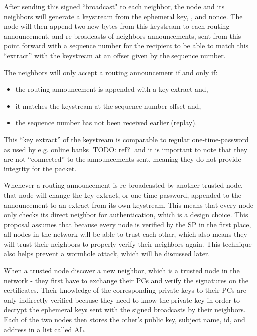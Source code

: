 After sending this signed ``broadcast" to each neighbor, the node and its
neighbors will generate a keystream from the ephemeral key, , and nonce. The
node will then append two new bytes from this keystream to each routing
announcement, and re-broadcasts of neighbors announcements, sent from this point
forward with a sequence number for the recipient to be able to match this
``extract'' with the keystream at an offset given by the sequence number.

The neighbors will only accept a routing announcement if and only if:

\begin{itemize}
  \item the routing announcement is appended with a key extract and,
  \item it matches the keystream at the sequence number offset and,
  \item the sequence number has not been received earlier (replay).
\end{itemize}

This ``key extract'' of the keystream is comparable to regular one-time-password
as used by e.g. online banks [TODO: ref?] and it is important to note that they
are not ``connected'' to the announcements sent, meaning they do not
provide integrity for the packet.

Whenever a routing announcement is re-broadcasted by another trusted node, that
node will change the key extract, or one-time-password, appended to the
announcement to an extract from its own keystream. This means that every node
only checks its direct neighbor for authentication, which is a design choice.
This proposal assumes that because every node is verified by the \ac{SP} in the
first place, all nodes in the network will be able to trust each other, which
also means they will trust their neighbors to properly verify their neighbors
again. This technique also helps prevent a wormhole attack, which will be
discussed later.


When a trusted node discover a new neighbor, which is a trusted node in the
network - they first have to exchange their \acp{PC} and verify the signatures
on the certificates. Their knowledge of the corresponding private keys to their
\acp{PC} are only indirectly verified because they need to know the private key
in order to decrypt the ephemeral keys sent with the signed broadcasts by their
neighbors. Each of the two nodes then stores the other's public key, subject
name, id, and address in a list called \ac{AL}.

